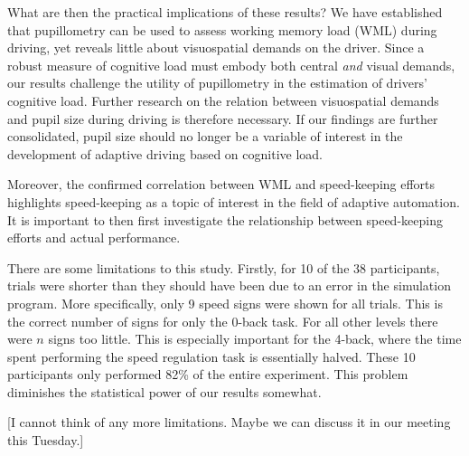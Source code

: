 What are then the practical implications of these results? 
We have established that pupillometry can be used to assess working memory load (WML) during driving, yet reveals little about visuospatial demands on the driver.
Since a robust measure of cognitive load must embody both central \textit{and} visual demands, our results challenge the utility of pupillometry in the estimation of drivers' cognitive load.
Further research on the relation between visuospatial demands and pupil size during driving is therefore necessary.
If our findings are further consolidated, pupil size should no longer be a variable of interest in the development of adaptive driving based on cognitive load.

Moreover, the confirmed correlation between WML and speed-keeping efforts highlights speed-keeping as a topic of interest in the field of adaptive automation.
It is important to then first investigate the relationship between speed-keeping efforts and actual performance.

There are some limitations to this study. 
Firstly, for 10 of the 38 participants, trials were shorter than they should have been due to an error in the simulation program.
More specifically, only 9 speed signs were shown for all trials. 
This is the correct number of signs for only the 0-back task.
For all other \nback levels there were \(n\) signs too little. 
This is especially important for the 4-back, where the time spent performing the speed regulation task is essentially halved.
These 10 participants only performed 82\% of the entire experiment.
This problem diminishes the statistical power of our results somewhat.

[I cannot think of any more limitations. Maybe we can discuss it in our meeting this Tuesday.]